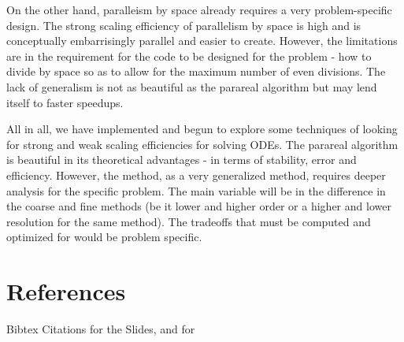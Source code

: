 \documentclass[letterpaper,twocolumn,11pt]{article}
\begin{document}
On the other hand, paralleism by space already requires a very problem-specific design.  The strong scaling efficiency of parallelism by space is high and is conceptually embarrisingly parallel and easier to create.  However, the limitations are in the requirement for the code to be designed for the problem - how to divide by space so as to allow for the maximum number of even divisions.  The lack of generalism is not as beautiful as the parareal algorithm but may lend itself to faster speedups.

All in all, we have implemented and begun to explore some techniques of looking for strong and weak scaling efficiencies for solving ODEs.  The parareal algorithm is beautiful in its theoretical advantages - in terms of stability, error and efficiency.  However, the method, as a very generalized method, requires deeper analysis for the specific problem.  The main variable will be in the difference in the coarse and fine methods (be it lower and higher order or a higher and lower resolution for the same method).  The tradeoffs that must be computed and optimized for would be problem specific.

\section{References}

Bibtex Citations for the Slides, and for %
\end{document}
